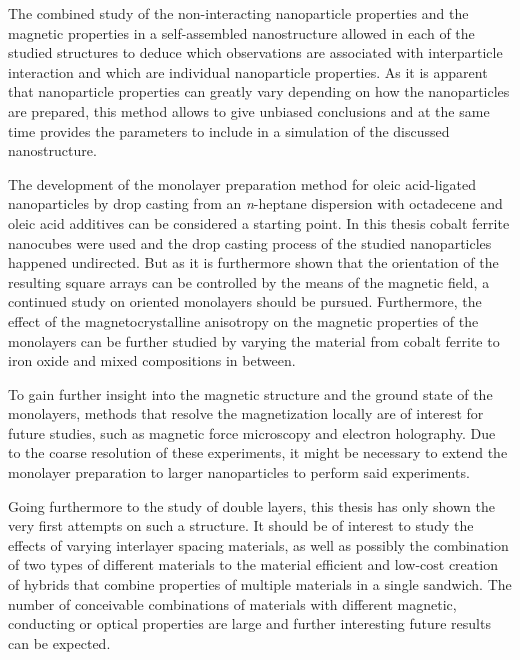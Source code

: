 \documentclass[\main/dresen_thesis.tex]{subfiles}
\begin{document}
  The combined study of the non-interacting nanoparticle properties and the magnetic properties in a self-assembled nanostructure allowed in each of the studied structures to deduce which observations are associated with interparticle interaction and which are individual nanoparticle properties.
  As it is apparent that nanoparticle properties can greatly vary depending on how the nanoparticles are prepared, this method allows to give unbiased conclusions and at the same time provides the parameters to include in a simulation of the discussed nanostructure.

    The development of the monolayer preparation method for oleic acid-ligated nanoparticles by drop casting from an \textit{n}-heptane dispersion with octadecene and oleic acid additives can be considered a starting point.
    In this thesis cobalt ferrite nanocubes were used and the drop casting process of the studied nanoparticles happened undirected.
    But as it is furthermore shown that the orientation of the resulting square arrays can be controlled by the means of the magnetic field, a continued study on oriented monolayers should be pursued.
    Furthermore, the effect of the magnetocrystalline anisotropy on the magnetic properties of the monolayers can be further studied by varying the material from cobalt ferrite to iron oxide and mixed compositions in between.

    To gain further insight into the magnetic structure and the ground state of the monolayers, methods that resolve the magnetization locally are of interest for future studies, such as magnetic force microscopy and electron holography.
    Due to the coarse resolution of these experiments, it might be necessary to extend the monolayer preparation to larger nanoparticles to perform said experiments.

    Going furthermore to the study of double layers, this thesis has only shown the very first attempts on such a structure.
    It should be of interest to study the effects of varying interlayer spacing materials, as well as possibly the combination of two types of different materials to the material efficient and low-cost creation of hybrids that combine properties of multiple materials in a single sandwich.
    The number of conceivable combinations of materials with different magnetic, conducting or optical properties are large and further interesting future results can be expected.
\end{document}
